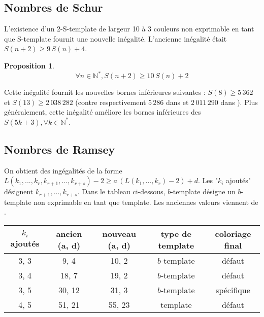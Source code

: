 \documentclass{article}
\newtheorem{proposition}[definition]{Proposition}
\begin{document}
\subsection{Nombres de Schur}

L'existence d'un 2-S-template de largeur 10 à 3 couleurs non exprimable en tant que S-template fournit une nouvelle inégalité. L'ancienne inégalité était \(S(n + 2) \geqslant 9 \, S(n) + 4\).

\begin{proposition}
	\[\forall n \in \mathbb{N}^*, S(n + 2) \geqslant 10 \, S(n) + 2\]
\end{proposition}

Cette inégalité fournit les nouvelles bornes inférieures suivantes : \(S(8) \geqslant 5\,362\) et \(S(13) \geqslant 2\,038\,282\) (contre respectivement \(5\,286\) dans \cite{RowleyRamsey} et \(2\,011\,290\) dans \cite{schurboyz}). Plus généralement, cette inégalité améliore les bornes inférieures des \(S(5 k + 3), \forall k \in \mathbb{N}^*\).

\subsection{Nombres de Ramsey}

On obtient des ingégalités de la forme \(L(k_1, ..., k_r, k_{r+1}, ..., k_{r+s}) - 2 \geqslant a \, (L(k_1, ..., k_r) - 2) + d\). Les "\(k_i\) ajoutés" désignent \( k_{r+1}, ..., k_{r+s}\). Dans le tableau ci-dessous, \(b\)-template désigne un \(b\)-template non exprimable en tant que template. Les anciennes valeurs viennent de \cite{rowleyramseysat}.
\begin{table}[H]\begin{center}
\begin{tabular}{| c | c | c | c | c |}
	\hline
	\(k_i\) ajoutés & ancien (a, d) & nouveau (a, d) & type de template & coloriage final \\
	\hline
	3, 3 & 9, 4 & 10, 2 & \(b\)-template & défaut \\
	\hline
	3, 4 & 18, 7 & 19, 2 & \(b\)-template & défaut \\
	\hline
	3, 5 & 30, 12 & 31, 3 & \(b\)-template & spécifique \\
	\hline
	4, 5 & 51, 21 & 55, 23 & template & défaut \\
	\hline
\end{tabular}
\end{center}\end{table}
\end{document}
